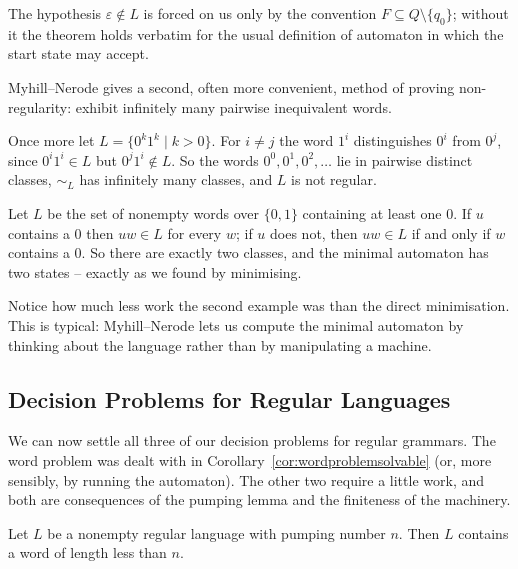 \documentclass[a4paper]{scrartcl}
\newcommand{\eps}{\varepsilon}
\begin{document}
\begin{remark}
	The hypothesis $\eps \notin L$ is forced on us only by the convention $F \subseteq Q \setminus \{q_0\}$; without it the theorem holds verbatim for the usual definition of automaton in which the start state may accept.
\end{remark}

Myhill--Nerode gives a second, often more convenient, method of proving non-regularity: exhibit infinitely many pairwise inequivalent words.

\begin{example}
	Once more let $L = \{0^k1^k \mid k > 0\}$. For $i \neq j$ the word $1^i$ distinguishes $0^i$ from $0^j$, since $0^i1^i \in L$ but $0^j1^i \notin L$. So the words $0^0, 0^1, 0^2, \dots$ lie in pairwise distinct classes, $\sim_L$ has infinitely many classes, and $L$ is not regular.
\end{example}

\begin{example}
	Let $L$ be the set of nonempty words over $\{0,1\}$ containing at least one $0$. If $u$ contains a $0$ then $uw \in L$ for every $w$; if $u$ does not, then $uw \in L$ if and only if $w$ contains a $0$. So there are exactly two classes, and the minimal automaton has two states -- exactly as we found by minimising.
\end{example}

Notice how much less work the second example was than the direct minimisation. This is typical: Myhill--Nerode lets us compute the minimal automaton by thinking about the language rather than by manipulating a machine.

\subsection{Decision Problems for Regular Languages}

We can now settle all three of our decision problems for regular grammars. The word problem was dealt with in Corollary~\ref{cor:wordproblemsolvable} (or, more sensibly, by running the automaton). The other two require a little work, and both are consequences of the pumping lemma and the finiteness of the machinery.

\begin{lemma}\label{lem:shortword}
	Let $L$ be a nonempty regular language with pumping number $n$. Then $L$ contains a word of length less than $n$.
\end{lemma}
\end{document}
